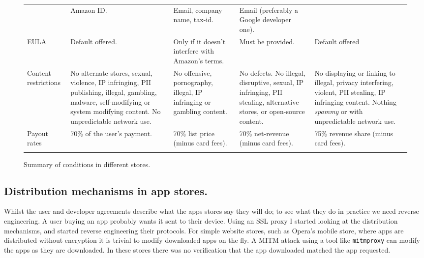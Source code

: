 \documentclass[a4paper]{scrartcl}
\begin{document}
\begin{figure}[!h]
\begin{tabulary}{\linewidth}{lLLLL}
                     & Amazon ID.
                     & Email, company name, tax-id.
                     & Email (preferably a Google developer one).                                                                                                                        \\ \addlinespace
EULA                 & Default offered.
                     & Only if it doesn't interfere with Amazon's terms.
                     & Must be provided.
                     & Default offered                                                                                                                                                   \\ \addlinespace
Content restrictions & No alternate stores, sexual, violence, IP infringing, PII publishing, illegal, gambling, malware, self-modifying or system modifying content.  No unpredictable network use.
                     & No offensive, pornography, illegal, IP infringing or gambling content.
                     & No defects. No illegal, disruptive, sexual, IP infringing, PII stealing, alternative stores, or open-source content.
                     & No displaying or linking to illegal, privacy interfering, violent, PII stealing, IP infringing content.  Nothing \emph{spammy} or with unpredictable network use. \\ \addlinespace
Payout rates         & 70\% of the user's payment.
                     & 70\% list price (minus card fees).
                     & 70\% net-revenue (minus card fees).
                     & 75\% revenue share (minus card fees).                                                                                                                             \\ \addlinespace
\bottomrule
\end{tabulary}
\caption{Summary of conditions in different stores.}
\label{tab:terms}
\end{figure}

\subsection{Distribution mechanisms in app stores.}

Whilst the user and developer agreements describe what the apps stores say they will do; to see what they do in practice we need reverse engineering.
A user buying an app probably wants it sent to their device.
Using an SSL proxy I started looking at the distribution mechanisms, and started reverse engineering their protocols.
For simple website stores, such as Opera's mobile store, where apps are distributed without encryption it is trivial to modify downloaded apps on the fly.
A \ac{MITM} attack using a tool like \texttt{mitmproxy} can modify the apps as they are downloaded.
In these stores there was no verification that the app downloaded matched the app requested.
\end{document}
